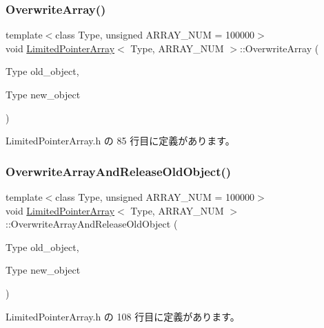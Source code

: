 \subsubsection{\texorpdfstring{Overwrite\+Array()}{OverwriteArray()}}
{\footnotesize\ttfamily template$<$class Type, unsigned A\+R\+R\+A\+Y\+\_\+\+N\+UM = 100000$>$ \\
void \mbox{\hyperlink{class_limited_pointer_array}{Limited\+Pointer\+Array}}$<$ Type, A\+R\+R\+A\+Y\+\_\+\+N\+UM $>$\+::Overwrite\+Array (\begin{DoxyParamCaption}\item[{Type}]{old\+\_\+object,  }\item[{Type}]{new\+\_\+object }\end{DoxyParamCaption})\hspace{0.3cm}{\ttfamily [inline]}}



 Limited\+Pointer\+Array.\+h の 85 行目に定義があります。

\mbox{\label{class_limited_pointer_array_a6c46bb77df04a9e1226025f8c48e26cb}} 
\subsubsection{\texorpdfstring{Overwrite\+Array\+And\+Release\+Old\+Object()}{OverwriteArrayAndReleaseOldObject()}}
{\footnotesize\ttfamily template$<$class Type, unsigned A\+R\+R\+A\+Y\+\_\+\+N\+UM = 100000$>$ \\
void \mbox{\hyperlink{class_limited_pointer_array}{Limited\+Pointer\+Array}}$<$ Type, A\+R\+R\+A\+Y\+\_\+\+N\+UM $>$\+::Overwrite\+Array\+And\+Release\+Old\+Object (\begin{DoxyParamCaption}\item[{Type}]{old\+\_\+object,  }\item[{Type}]{new\+\_\+object }\end{DoxyParamCaption})\hspace{0.3cm}{\ttfamily [inline]}}



 Limited\+Pointer\+Array.\+h の 108 行目に定義があります。

\mbox{\label{class_limited_pointer_array_a5e34faa11f4b901153f85428027aa21e}} 
